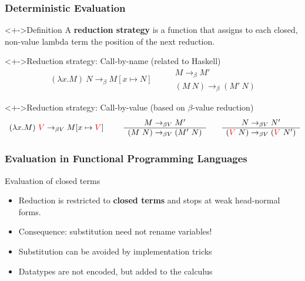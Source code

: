 \documentclass[pdftex,aspectratio=169]{beamer}
\begin{document}
\begin{frame}[fragile]
  \frametitle{Deterministic Evaluation}
  \begin{block}<+->{Definition}
    A \textbf{reduction strategy} is a function that assigns to each closed, non-value lambda term the position of the next reduction. 
  \end{block}
  \begin{block}<+->{Reduction strategy: Call-by-name (related to Haskell)}
    \begin{displaymath}
    \begin{array}{c}
      (\lambda x.M)~N \rightarrow_{\beta} M[x \mapsto N]
    \end{array}
    \qquad
    \begin{array}{c}
      M \rightarrow_\beta M'
      \\\hline
      (M~N) \rightarrow_\beta (M'~N)
    \end{array}
  \end{displaymath}
\end{block}
\begin{block}<+->{Reduction strategy: Call-by-value (based on $\beta$-value reduction)}
  \begin{displaymath}
    \begin{array}{c}
      (\lambda x.M)~\textcolor{red}{V} \rightarrow_{\beta V} M[x \mapsto \textcolor{red}{V}]
    \end{array}
    \qquad
    \begin{array}{c}
      M \rightarrow_{\beta V} M'
      \\\hline
      (M~N) \rightarrow_{\beta V} (M'~N)
    \end{array}
    \qquad
    \begin{array}{c}
      N \rightarrow_{\beta V} N'
      \\\hline
      (\textcolor{red}{V}~N) \rightarrow_{\beta V} (\textcolor{red}{V}~N')
    \end{array}
  \end{displaymath}
\end{block}
\end{frame}
\begin{frame}[fragile]
  \frametitle{Evaluation in Functional Programming Languages}
  \begin{block}{Evaluation of closed terms}
    \begin{itemize}[<+->]
    \item Reduction is restricted to \textbf{closed terms} and stops at weak head-normal forms.
    \item Consequence: substitution need not rename variables!
    \item Substitution can be avoided by implementation tricks
    \item Datatypes are not encoded, but added to the calculus
    \end{itemize}
  \end{block}
\end{frame}
\end{document}
